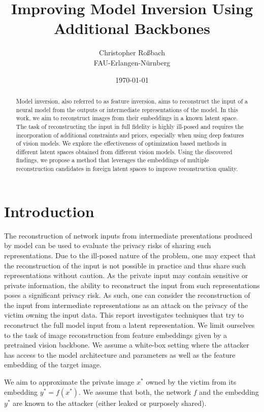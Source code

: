 \documentclass[10pt,twocolumn]{article}
\title{Improving Model Inversion Using Additional Backbones}
\author{Christopher Roßbach \\ FAU-Erlangen-Nürnberg}
\date{\today}
\begin{document}
\maketitle
\begin{abstract}
    Model inversion, also referred to as feature inversion, aims to reconstruct the input of a neural model from the outputs or intermediate representations of the model.
    In this work, we aim to reconstruct images from their embeddings in a known latent space.
    The task of reconstructing the input in full fidelity is highly ill-posed and requires the incorporation of additional constraints and priors, especially when using deep features of vision models.
    We explore the effectiveness of optimization based methods in different latent spaces obtained from different vision models.
    Using the discovered findings, we propose a method that leverages the embeddings of multiple reconstruction candidates in foreign latent spaces to improve reconstruction quality.
\end{abstract}

\section{Introduction}
The reconstruction of network inputs from intermediate presentations produced by model can be used to evaluate the privacy risks of sharing such representations.
Due to the ill-posed nature of the problem, one may expect that the reconstruction of the input is not possible in practice and thus share such representations without caution.
As the private input may contain sensitive or private information, the ability to reconstruct the input from such representations poses a significant privacy risk.
As such, one can consider the reconstruction of the input from intermediate representations as an attack on the privacy of the victim owning the input data.
This report investigates techniques that try to reconstruct the full model input from a latent representation.
We limit ourselves to the task of image reconstruction from feature embeddings given by a pretrained vision backbone.
We assume a white-box setting where the attacker has access to the model architecture and parameters as well as the feature embedding of the target image.

We aim to approximate the private image $x^*$ owned by the victim from its embedding $y^* = f(x^*)$.
We assume that both, the network $f$ and the embedding $y^*$ are known to the attacker (either leaked or purposely shared).
\end{document}
